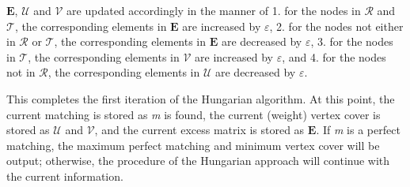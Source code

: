 \documentclass[11pt]{article}
\begin{document}
$\mathbf{E}$, $\mathcal{U}$ and $\mathcal{V}$ are updated accordingly in the manner of 1. for the nodes in $\mathcal{R}$ and $\mathcal{T}$, the corresponding elements in $\mathbf{E}$ are increased by $\varepsilon$, 2. for the nodes not either in $\mathcal{R}$ or $\mathcal{T}$, the corresponding elements in $\mathbf{E}$ are decreased by $\varepsilon$, 3. for the nodes in $\mathcal{T}$, the corresponding elements in $\mathcal{V}$ are increased by $\varepsilon$, and 4. for the nodes not in $\mathcal{R}$, the corresponding elements in $\mathcal{U}$ are decreased by $\varepsilon$. %

This completes the first iteration of the Hungarian algorithm. At this point, the current matching is stored as \emph{m} is found, the current (weight) vertex cover is stored as $\mathcal{U}$ and $\mathcal{V}$, and the current excess matrix is stored as $\mathbf{E}$. If \emph{m} is a perfect matching, the maximum perfect matching and minimum vertex cover will be output; otherwise, the procedure of the Hungarian approach will continue with the current information.%
\end{document}

